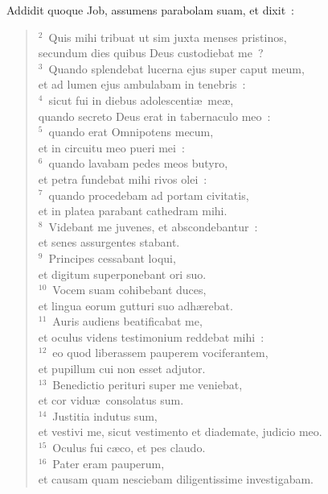 \lettrine[lines=3,image=true,loversize=0.05,lraise=-0.03]{A}{}ddidit quoque Job, assumens parabolam suam, et dixit~:
\begin{flushleft}\begin{verse}\vspace{6pt}${}^{2}$~Quis mihi tribuat ut sim juxta menses pristinos,\\ secundum dies quibus Deus custodiebat me~?\\
${}^{3}$~Quando splendebat lucerna ejus super caput meum,\\ et ad lumen ejus ambulabam in tenebris~:\\
${}^{4}$~sicut fui in diebus adolescenti\ae\ me\ae ,\\ quando secreto Deus erat in tabernaculo meo~:\\
${}^{5}$~quando erat Omnipotens mecum,\\ et in circuitu meo pueri mei~:\\
${}^{6}$~quando lavabam pedes meos butyro,\\ et petra fundebat mihi rivos olei~:\\
${}^{7}$~quando procedebam ad portam civitatis,\\ et in platea parabant cathedram mihi.\\
${}^{8}$~Videbant me juvenes, et abscondebantur~:\\ et senes assurgentes stabant.\\
${}^{9}$~Principes cessabant loqui,\\ et digitum superponebant ori suo.\\
${}^{10}$~Vocem suam cohibebant duces,\\ et lingua eorum gutturi suo adh\ae rebat.\\
${}^{11}$~Auris audiens beatificabat me,\\ et oculus videns testimonium reddebat mihi~:\\
${}^{12}$~eo quod liberassem pauperem vociferantem,\\ et pupillum cui non esset adjutor.\\
${}^{13}$~Benedictio perituri super me veniebat,\\ et cor vidu\ae\ consolatus sum.\\
${}^{14}$~Justitia indutus sum,\\ et vestivi me, sicut vestimento et diademate, judicio meo.\\
${}^{15}$~Oculus fui c\ae co, et pes claudo.\\
${}^{16}$~Pater eram pauperum,\\ et causam quam nesciebam diligentissime investigabam.\\

\end{verse}
\end{flushleft}
